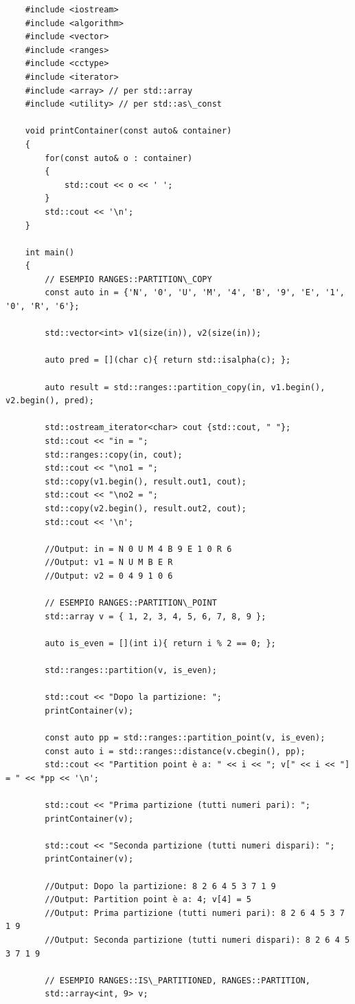 \begin{lstlisting}
	#include <iostream>
	#include <algorithm>
	#include <vector>
	#include <ranges>
	#include <cctype>
	#include <iterator>
	#include <array> // per std::array
	#include <utility> // per std::as\_const
	
	void printContainer(const auto& container)
	{
		for(const auto& o : container)
		{
			std::cout << o << ' ';
		}
		std::cout << '\n';
	}
	
	int main()
	{
		// ESEMPIO RANGES::PARTITION\_COPY
		const auto in = {'N', '0', 'U', 'M', '4', 'B', '9', 'E', '1', '0', 'R', '6'};
		
		std::vector<int> v1(size(in)), v2(size(in));
		
		auto pred = [](char c){ return std::isalpha(c); };
		
		auto result = std::ranges::partition_copy(in, v1.begin(), v2.begin(), pred);
		
		std::ostream_iterator<char> cout {std::cout, " "};
		std::cout << "in = ";
		std::ranges::copy(in, cout);
		std::cout << "\no1 = ";
		std::copy(v1.begin(), result.out1, cout);
		std::cout << "\no2 = ";
		std::copy(v2.begin(), result.out2, cout);
		std::cout << '\n';
		
		//Output: in = N 0 U M 4 B 9 E 1 0 R 6 
		//Output: v1 = N U M B E R 
		//Output: v2 = 0 4 9 1 0 6 
		
		// ESEMPIO RANGES::PARTITION\_POINT
		std::array v = { 1, 2, 3, 4, 5, 6, 7, 8, 9 };
		
		auto is_even = [](int i){ return i % 2 == 0; };
		
		std::ranges::partition(v, is_even);
		
		std::cout << "Dopo la partizione: ";
		printContainer(v);
		
		const auto pp = std::ranges::partition_point(v, is_even);
		const auto i = std::ranges::distance(v.cbegin(), pp);
		std::cout << "Partition point è a: " << i << "; v[" << i << "] = " << *pp << '\n';
		
		std::cout << "Prima partizione (tutti numeri pari): ";
		printContainer(v);
		
		std::cout << "Seconda partizione (tutti numeri dispari): ";
		printContainer(v);
		
		//Output: Dopo la partizione: 8 2 6 4 5 3 7 1 9 
		//Output: Partition point è a: 4; v[4] = 5
		//Output: Prima partizione (tutti numeri pari): 8 2 6 4 5 3 7 1 9 
		//Output: Seconda partizione (tutti numeri dispari): 8 2 6 4 5 3 7 1 9
		
		// ESEMPIO RANGES::IS\_PARTITIONED, RANGES::PARTITION, 
		std::array<int, 9> v;
		

\end{lstlisting}
